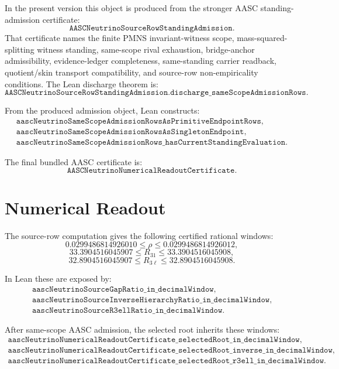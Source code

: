 \documentclass[11pt]{article}
\begin{document}
In the present version this object is produced from the stronger AASC
standing-admission certificate:
\[
  \texttt{AASCNeutrinoSourceRowStandingAdmission}.
\]
That certificate names the finite PMNS invariant-witness scope,
mass-squared-splitting witness standing, same-scope rival exhaustion,
bridge-anchor admissibility, evidence-ledger completeness, same-standing
carrier readback, quotient/skin transport compatibility, and source-row
non-empiricality conditions.  The Lean discharge theorem is:
\[
  \texttt{AASCNeutrinoSourceRowStandingAdmission.discharge\_sameScopeAdmissionRows}.
\]

From the produced admission object, Lean constructs:
\[
\begin{array}{ll}
\texttt{aascNeutrinoSameScopeAdmissionRowsAsPrimitiveEndpointRows},\\
\texttt{aascNeutrinoSameScopeAdmissionRowsAsSingletonEndpoint},\\
\texttt{aascNeutrinoSameScopeAdmissionRows\_hasCurrentStandingEvaluation}.
\end{array}
\]

The final bundled AASC certificate is:
\[
  \texttt{AASCNeutrinoNumericalReadoutCertificate}.
\]

\section{Numerical Readout}

The source-row computation gives the following certified rational windows:
\[
  0.0299486814926010
  \leq \rho
  \leq
  0.0299486814926012,
\]
\[
  33.3904516045907
  \leq R_{31}
  \leq
  33.3904516045908,
\]
\[
  32.8904516045907
  \leq R_{3\ell}
  \leq
  32.8904516045908.
\]

In Lean these are exposed by:
\[
\begin{array}{ll}
\texttt{aascNeutrinoSourceGapRatio\_in\_decimalWindow},\\
\texttt{aascNeutrinoSourceInverseHierarchyRatio\_in\_decimalWindow},\\
\texttt{aascNeutrinoSourceR3ellRatio\_in\_decimalWindow}.
\end{array}
\]

After same-scope AASC admission, the selected root inherits these windows:
\[
\begin{array}{ll}
\texttt{aascNeutrinoNumericalReadoutCertificate\_selectedRoot\_in\_decimalWindow},\\
\texttt{aascNeutrinoNumericalReadoutCertificate\_selectedRoot\_inverse\_in\_decimalWindow},\\
\texttt{aascNeutrinoNumericalReadoutCertificate\_selectedRoot\_r3ell\_in\_decimalWindow}.
\end{array}
\]
\end{document}
